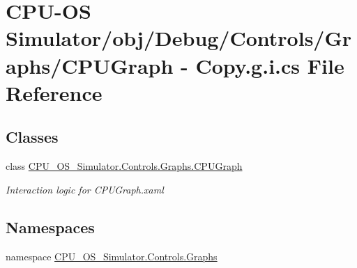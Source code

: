 \hypertarget{_c_p_u_graph_01-_01_copy_8g_8i_8cs}{}\section{C\+P\+U-\/\+O\+S Simulator/obj/\+Debug/\+Controls/\+Graphs/\+C\+P\+U\+Graph -\/ Copy.\+g.\+i.\+cs File Reference}
\label{_c_p_u_graph_01-_01_copy_8g_8i_8cs}
\subsection*{Classes}
\begin{DoxyCompactItemize}
\item 
class \hyperlink{class_c_p_u___o_s___simulator_1_1_controls_1_1_graphs_1_1_c_p_u_graph}{C\+P\+U\+\_\+\+O\+S\+\_\+\+Simulator.\+Controls.\+Graphs.\+C\+P\+U\+Graph}
\begin{DoxyCompactList}\small\item\em Interaction logic for C\+P\+U\+Graph.\+xaml \end{DoxyCompactList}\end{DoxyCompactItemize}
\subsection*{Namespaces}
\begin{DoxyCompactItemize}
\item 
namespace \hyperlink{namespace_c_p_u___o_s___simulator_1_1_controls_1_1_graphs}{C\+P\+U\+\_\+\+O\+S\+\_\+\+Simulator.\+Controls.\+Graphs}
\end{DoxyCompactItemize}
